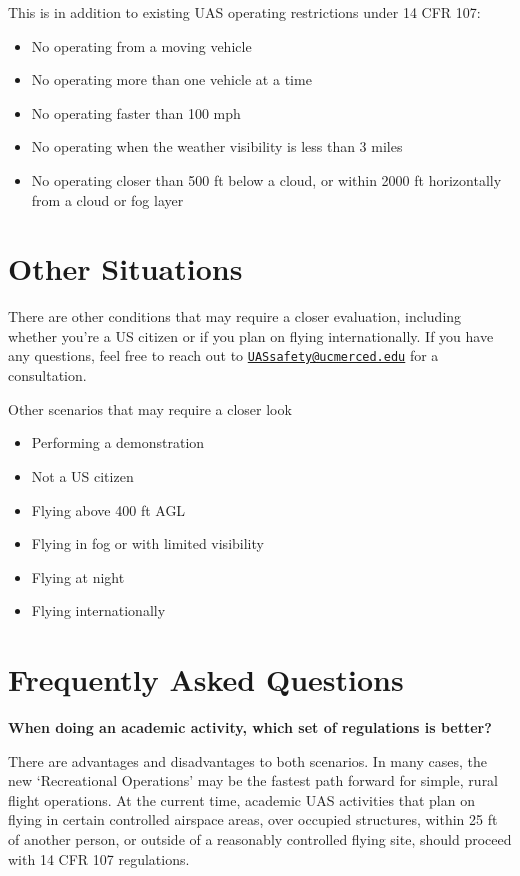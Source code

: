 \documentclass[
]{book}
\providecommand{\tightlist}{%
  \setlength{\itemsep}{0pt}\setlength{\parskip}{0pt}}
\begin{document}
This is in addition to existing UAS operating restrictions under 14 CFR 107:

\begin{itemize}
\tightlist
\item
  No operating from a moving vehicle
\item
  No operating more than one vehicle at a time
\item
  No operating faster than 100 mph
\item
  No operating when the weather visibility is less than 3 miles
\item
  No operating closer than 500 ft below a cloud, or within 2000 ft horizontally from a cloud or fog layer
\end{itemize}

\hypertarget{other-situations}{%
\section{Other Situations}\label{other-situations}}

There are other conditions that may require a closer evaluation, including whether you're a US citizen or if you plan on flying internationally. If you have any questions, feel free to reach out to \href{mailto:UASsafety@ucmerced.edu}{\nolinkurl{UASsafety@ucmerced.edu}} for a consultation.

Other scenarios that may require a closer look

\begin{itemize}
\tightlist
\item
  Performing a demonstration
\item
  Not a US citizen
\item
  Flying above 400 ft AGL
\item
  Flying in fog or with limited visibility
\item
  Flying at night
\item
  Flying internationally
\end{itemize}

\hypertarget{frequently-asked-questions}{%
\section{Frequently Asked Questions}\label{frequently-asked-questions}}

\textbf{When doing an academic activity, which set of regulations is better?}

There are advantages and disadvantages to both scenarios. In many cases, the new `Recreational Operations' may be the fastest path forward for simple, rural flight operations. At the current time, academic UAS activities that plan on flying in certain controlled airspace areas, over occupied structures, within 25 ft of another person, or outside of a reasonably controlled flying site, should proceed with 14 CFR 107 regulations.
\end{document}
